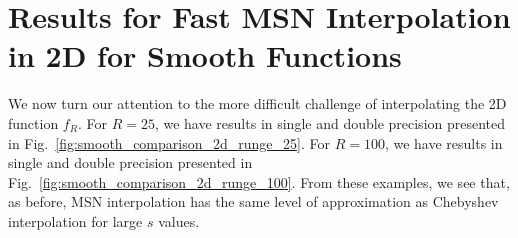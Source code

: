 \section{Results for Fast MSN Interpolation in 2D for Smooth Functions}
\label{sec:vs_I_2d}

We now turn our attention to the more difficult challenge
of interpolating the 2D function $f_{R}$.
For $R=25$, we have results in single and double precision presented
in Fig.~\ref{fig:smooth_comparison_2d_runge_25}.
For $R=100$, we have results in single and double precision presented
in Fig.~\ref{fig:smooth_comparison_2d_runge_100}.
From these examples, we see that, as before,
MSN interpolation has the same level of approximation as Chebyshev
interpolation for large $s$ values.



